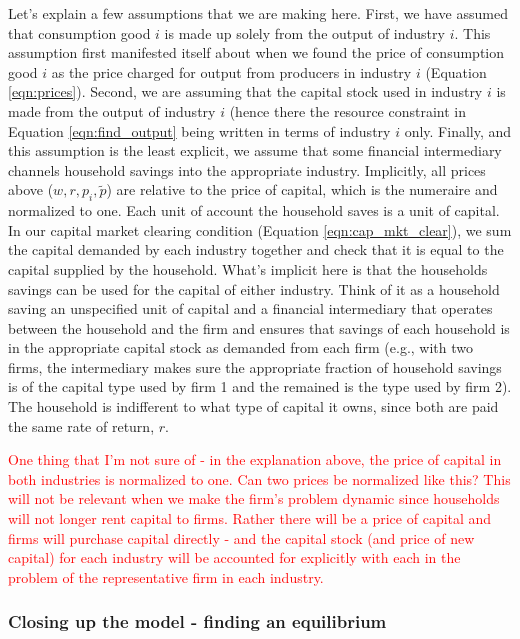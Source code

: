 \documentclass[letterpaper,12pt]{article}
\theoremstyle{definition}
\begin{document}
\begin{spacing}{1.5}
Let's explain a few assumptions that we are making here.  First, we have assumed that consumption good $i$ is made up solely from the output of industry $i$.  This assumption first manifested itself about when we found the price of consumption good $i$ as the price charged for output from producers in industry $i$ (Equation \ref{eqn:prices}).  Second, we are assuming that the capital stock used in industry $i$ is made from the output of industry $i$ (hence there the resource constraint in Equation \ref{eqn:find_output} being written in terms of industry $i$ only.  Finally, and this assumption is the least explicit, we assume that some financial intermediary channels household savings into the appropriate industry.  Implicitly, all prices above ($w, r, p_{i}, \tilde{p}$) are relative to the price of capital, which is the numeraire and normalized to one.  Each unit of account the household saves is a unit of capital.  In our capital market clearing condition (Equation \ref{eqn:cap_mkt_clear}), we sum the capital demanded by each industry together and check that it is equal to the capital supplied by the household.  What's implicit here is that the households savings can be used for the capital of either industry.  Think of it as a household saving an unspecified unit of capital and a financial intermediary that operates between the household and the firm and ensures that savings of each household is in the appropriate capital stock as demanded from each firm (e.g., with two firms, the intermediary makes sure the appropriate fraction of household savings is of the capital type used by firm 1 and the remained is the type used by firm 2).  The household is indifferent to what type of capital it owns, since both are paid the same rate of return, $r$.

\textcolor{red}{One thing that I'm not sure of - in the explanation above, the price of capital in both industries is normalized to one.  Can two prices be normalized like this?  This will not be relevant when we make the firm's problem dynamic since households will not longer rent capital to firms.  Rather there will be a price of capital and firms will purchase capital directly - and the capital stock (and price of new capital) for each industry will be accounted for explicitly with each in the problem of the representative firm in each industry.}


\subsubsection*{Closing up the model - finding an equilibrium}


\end{spacing}
\end{document}
